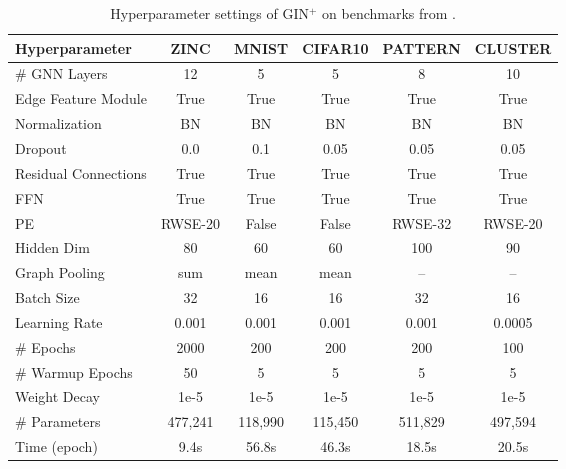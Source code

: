 \clearpage

\begin{table*}[h]
	\centering
        \small
         \caption{Hyperparameter settings of GIN$^+$ on benchmarks from \cite{dwivedi2023benchmarking}.}
	\begin{tabular}{lccccc}
		\toprule
		{Hyperparameter} & {ZINC} & {MNIST} & {CIFAR10} & {PATTERN} & {CLUSTER}\\
		\midrule
            \# GNN Layers & 12 & 5 & 5 & 8 & 10 \\
            Edge Feature Module & True & True & True & True & True \\
            Normalization & BN & BN & BN & BN & BN \\
            Dropout & 0.0 & 0.1 & 0.05 & 0.05 & 0.05 \\
            Residual Connections & True & True & True & True & True \\
            FFN & True & True & True & True & True \\
            PE & RWSE-20 & False & False & RWSE-32 & RWSE-20 \\
            Hidden Dim & 80 & 60 & 60 & 100 & 90 \\
            Graph Pooling & sum & mean & mean & – & – \\
		\midrule
            Batch Size & 32 & 16 & 16 & 32 & 16 \\
            Learning Rate & 0.001 & 0.001 & 0.001 & 0.001 & 0.0005 \\
            \# Epochs & 2000 & 200 & 200 & 200  & 100 \\
            \# Warmup Epochs & 50 & 5 & 5 & 5 & 5 \\
            Weight Decay & 1e-5 & 1e-5 & 1e-5 & 1e-5 & 1e-5 \\
		\midrule
            \# Parameters & 477,241 & 118,990 & 115,450 & 511,829 & 497,594 \\
            Time (epoch) & 9.4s & 56.8s & 46.3s & 18.5s & 20.5s \\
        \bottomrule
	\end{tabular}
	\label{tab:gin-parameter1}
\end{table*}

